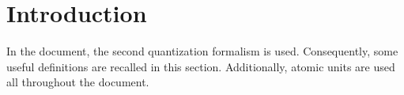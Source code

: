\graphicspath{{./figures/}}

\section{Introduction}
In the document, the second quantization formalism is used. 
Consequently, some useful definitions are recalled
in this section.
Additionally, atomic units are used all throughout the document.





